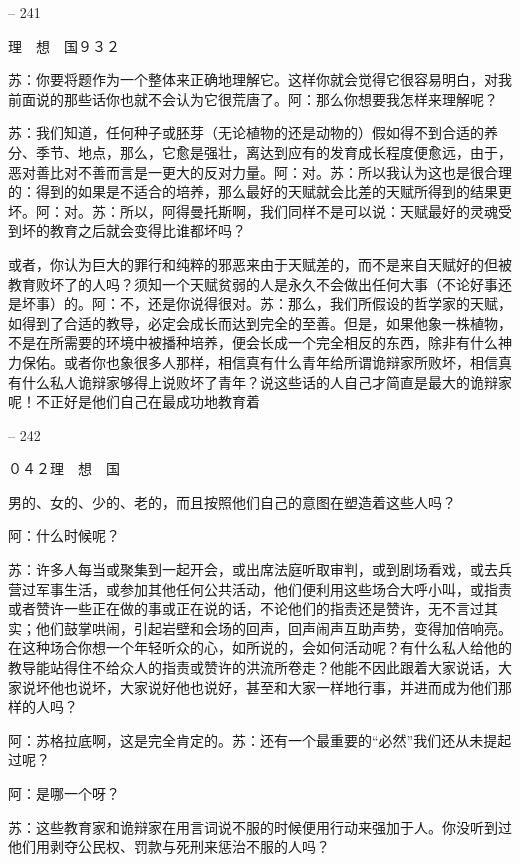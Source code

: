 \documentclass[11pt,oneside]{book}
\begin{document}
\begin{common-format}
    

-- 241

    理　想　国９３２

    苏：你要将题作为一个整体来正确地理解它。这样你就会觉得它很容易明白，对我前面说的那些话你也就不会认为它很荒唐了。阿：那么你想要我怎样来理解呢？

    苏：我们知道，任何种子或胚芽（无论植物的还是动物的）假如得不到合适的养分、季节、地点，那么，它愈是强壮，离达到应有的发育成长程度便愈远，由于，恶对善比对不善而言是一更大的反对力量。阿：对。苏：所以我认为这也是很合理的：得到的如果是不适合的培养，那么最好的天赋就会比差的天赋所得到的结果更坏。阿：对。苏：所以，阿得曼托斯啊，我们同样不是可以说：天赋最好的灵魂受到坏的教育之后就会变得比谁都坏吗？

    或者，你认为巨大的罪行和纯粹的邪恶来由于天赋差的，而不是来自天赋好的但被教育败坏了的人吗？须知一个天赋贫弱的人是永久不会做出任何大事（不论好事还是坏事）的。阿：不，还是你说得很对。苏：那么，我们所假设的哲学家的天赋，如得到了合适的教导，必定会成长而达到完全的至善。但是，如果他象一株植物，不是在所需要的环境中被播种培养，便会长成一个完全相反的东西，除非有什么神力保佑。或者你也象很多人那样，相信真有什么青年给所谓诡辩家所败坏，相信真有什么私人诡辩家够得上说败坏了青年？说这些话的人自己才简直是最大的诡辩家呢！不正好是他们自己在最成功地教育着

    

-- 242

    ０４２理　想　国

    男的、女的、少的、老的，而且按照他们自己的意图在塑造着这些人吗？

    阿：什么时候呢？

    苏：许多人每当或聚集到一起开会，或出席法庭听取审判，或到剧场看戏，或去兵营过军事生活，或参加其他任何公共活动，他们便利用这些场合大呼小叫，或指责或者赞许一些正在做的事或正在说的话，不论他们的指责还是赞许，无不言过其实；他们鼓掌哄闹，引起岩壁和会场的回声，回声闹声互助声势，变得加倍响亮。在这种场合你想一个年轻听众的心，如所说的，会如何活动呢？有什么私人给他的教导能站得住不给众人的指责或赞许的洪流所卷走？他能不因此跟着大家说话，大家说坏他也说坏，大家说好他也说好，甚至和大家一样地行事，并进而成为他们那样的人吗？

    阿：苏格拉底啊，这是完全肯定的。苏：还有一个最重要的“必然”我们还从未提起过呢？

    阿：是哪一个呀？

    苏：这些教育家和诡辩家在用言词说不服的时候便用行动来强加于人。你没听到过他们用剥夺公民权、罚款与死刑来惩治不服的人吗？


\end{common-format}
\end{document}

